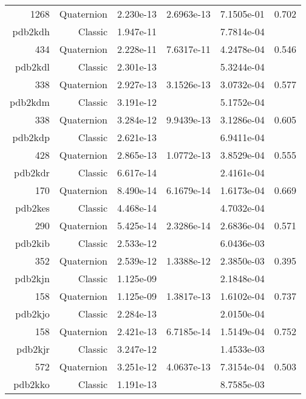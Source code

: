 \begin{xltabular}{\textwidth}{r|rS[table-format=1.3e+2]S[table-format=1.4e+2]S[table-format=1.4e+2]S[table-format=-1.3]}
1268 & Quaternion & 2.230e-13 & 2.6963e-13 & 7.1505e-01 & 0.702\\  \addlinespace
{\color{red} pdb2kdh } & Classic & 1.947e-11 &  & 7.7814e-04 & \\
434 & Quaternion & 2.228e-11 & 7.6317e-11 & 4.2478e-04 & 0.546\\  \addlinespace
{\color{red} pdb2kdl } & Classic & 2.301e-13 &  & 5.3244e-04 & \\
338 & Quaternion & 2.927e-13 & 3.1526e-13 & 3.0732e-04 & 0.577\\  \addlinespace
{\color{red} pdb2kdm } & Classic & 3.191e-12 &  & 5.1752e-04 & \\
338 & Quaternion & 3.284e-12 & 9.9439e-13 & 3.1286e-04 & 0.605\\  \addlinespace
{\color{red} pdb2kdp } & Classic & 2.621e-13 &  & 6.9411e-04 & \\
428 & Quaternion & 2.865e-13 & 1.0772e-13 & 3.8529e-04 & 0.555\\  \addlinespace
{\color{red} pdb2kdr } & Classic & 6.617e-14 &  & 2.4161e-04 & \\
170 & Quaternion & 8.490e-14 & 6.1679e-14 & 1.6173e-04 & 0.669\\  \addlinespace
{\color{red} pdb2kes } & Classic & 4.468e-14 &  & 4.7032e-04 & \\
290 & Quaternion & 5.425e-14 & 2.3286e-14 & 2.6836e-04 & 0.571\\  \addlinespace
{\color{red} pdb2kib } & Classic & 2.533e-12 &  & 6.0436e-03 & \\
352 & Quaternion & 2.539e-12 & 1.3388e-12 & 2.3850e-03 & 0.395\\  \addlinespace
{\color{red} pdb2kjn } & Classic & 1.125e-09 &  & 2.1848e-04 & \\
158 & Quaternion & 1.125e-09 & 1.3817e-13 & 1.6102e-04 & 0.737\\  \addlinespace
{\color{red} pdb2kjo } & Classic & 2.284e-13 &  & 2.0150e-04 & \\
158 & Quaternion & 2.421e-13 & 6.7185e-14 & 1.5149e-04 & 0.752\\  \addlinespace
{\color{red} pdb2kjr } & Classic & 3.247e-12 &  & 1.4533e-03 & \\
572 & Quaternion & 3.251e-12 & 4.0637e-13 & 7.3154e-04 & 0.503\\  \addlinespace
{\color{red} pdb2kko } & Classic & 1.191e-13 &  & 8.7585e-03 & \\

\end{xltabular}
